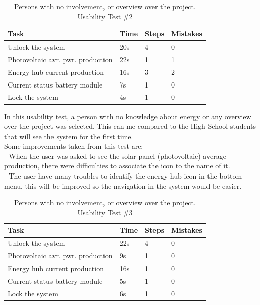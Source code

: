 \begin{table}[H]
	\begin{tabular}{ | l | l | l | l |}
		\hline
		Task 					     & 		Time 	& 	Steps 	&	 Mistakes \\ \hline
		Unlock the system 			     & 		20s 		&	 4 		& 		0 	\\ \hline
		Photovoltaic avr. pwr. production  & 		22s 		& 	 1 		& 		1 	\\ \hline
		Energy hub current production 	     & 		16s 		& 	 3 		& 		2 	\\ \hline
		Current status battery module 	     & 		7s 		& 	 1 		& 		0 	\\ \hline
		Lock the system 			     & 		4s 		& 	 1 		& 		0 	\\ \hline
	\end{tabular}
     \caption{Persons with no involvement, or overview over the project. Usability Test \#2}
\end{table}

In this usability test, a person with no knowledge about energy or any overview over the project was selected. This can me compared to the High School students that will see the system for the first time.\\
Some improvements taken from this test are:\\
- When the user was asked to see the solar panel (photovoltaic) average production, there were difficulties to associate the icon to the name of it.\\
- The user have many troubles to identify the energy hub icon in the bottom menu, this will be improved so the navigation in the system would be easier.\\

\begin{table}[H]
	\begin{tabular}{ | l | l | l | l |}
		\hline
		Task 					      & 	Time 	& 	Steps 	& 	Mistakes  \\ \hline
		Unlock the system 			      & 	22s 		& 	4 		& 	0 		\\ \hline
		Photovoltaic avr. pwr. production   & 	9s 		& 	1 		& 	0 		\\ \hline
		Energy hub current production 	      & 	16s 		& 	1 		& 	0 		\\ \hline
		Current status battery module 	      & 	5s 		& 	1 		& 	0 		\\ \hline
		Lock the system 			      & 	6s 		& 	1 		& 	0		\\ \hline
	\end{tabular}
    \caption{Persons with no involvement, or overview over the project. Usability Test \#3}
\end{table}

